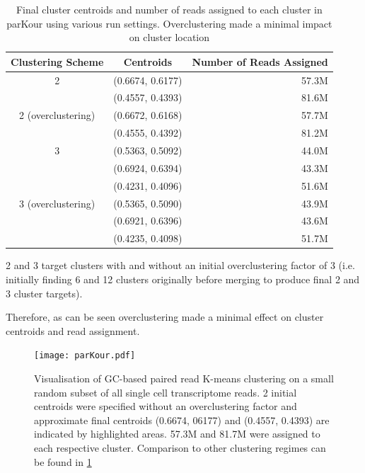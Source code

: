 \begin{table}
    \begin{tabular}{ccr}
        \toprule
        Clustering Scheme & Centroids & Number of Reads Assigned \\
        \midrule
        \midrule
        2                    & (0.6674, 0.6177) & 57.3M \\
                             & (0.4557, 0.4393) & 81.6M \\
        \midrule
        2 (overclustering)   & (0.6672, 0.6168) & 57.7M \\
                             & (0.4555, 0.4392) & 81.2M \\
        \midrule
        3                    & (0.5363, 0.5092) & 44.0M \\
                             & (0.6924, 0.6394) & 43.3M \\
                             & (0.4231, 0.4096) & 51.6M \\
        \midrule
        3 (overclustering)   & (0.5365, 0.5090) & 43.9M \\
                             & (0.6921, 0.6396) & 43.6M \\
                             & (0.4235, 0.4098) & 51.7M \\
        \bottomrule
    \end{tabular} 
    \caption{Final cluster centroids and number of reads assigned
    to each cluster in parKour using various run settings.  Overclustering
made a minimal impact on cluster location}
    \label{tab:centroids} 
\end{table} 

2 and 3 target clusters with and without an initial 
overclustering factor of 3 (i.e. initially finding 6 and 12 clusters originally before merging to
produce final 2 and 3 cluster targets). 

Therefore, as can be seen overclustering made a minimal effect on cluster centroids and read assignment.

\begin{figure}
    \texttt{[image: parKour.pdf]}
    \caption{Visualisation of GC-based paired read K-means clustering on a small random subset of all single cell transcriptome
    reads. 2 initial centroids were specified without an overclustering factor and approximate final centroids (0.6674, 06177) and (0.4557, 0.4393) are indicated by highlighted areas.  57.3M and 81.7M were assigned to each respective cluster. Comparison to other clustering regimes can be found in \ref{tab:centroids}} 
        \label{fig:parkour} 
\end{figure}

